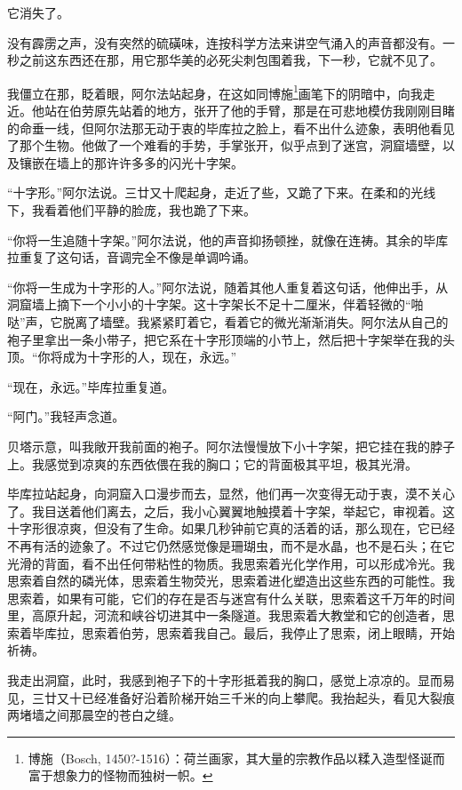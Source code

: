 \documentclass[AutoFakeBold=true]{book}
\begin{document}
它消失了。

没有霹雳之声，没有突然的硫磺味，连按科学方法来讲空气涌入的声音都没有。一秒之前这东西还在那，用它那华美的必死尖刺包围着我，下一秒，它就不见了。

我僵立在那，眨着眼，阿尔法站起身，在这如同博施\footnote{博施（Bosch, 1450?-1516）：荷兰画家，其大量的宗教作品以糅入造型怪诞而富于想象力的怪物而独树一帜。}画笔下的阴暗中，向我走近。他站在伯劳原先站着的地方，张开了他的手臂，那是在可悲地模仿我刚刚目睹的命垂一线，但阿尔法那无动于衷的毕库拉之脸上，看不出什么迹象，表明他看见了那个生物。他做了一个难看的手势，手掌张开，似乎点到了迷宫，洞窟墙壁，以及镶嵌在墙上的那许许多多的闪光十字架。

``十字形。''阿尔法说。三廿又十爬起身，走近了些，又跪了下来。在柔和的光线下，我看着他们平静的脸庞，我也跪了下来。

``你将一生追随十字架。''阿尔法说，他的声音抑扬顿挫，就像在连祷。其余的毕库拉重复了这句话，音调完全不像是单调吟诵。

``你将一生成为十字形的人。''阿尔法说，随着其他人重复着这句话，他伸出手，从洞窟墙上摘下一个小小的十字架。这十字架长不足十二厘米，伴着轻微的``啪哒''声，它脱离了墙壁。我紧紧盯着它，看着它的微光渐渐消失。阿尔法从自己的袍子里拿出一条小带子，把它系在十字形顶端的小节上，然后把十字架举在我的头顶。``你将成为十字形的人，现在，永远。''

``现在，永远。''毕库拉重复道。

``阿门。''我轻声念道。

贝塔示意，叫我敞开我前面的袍子。阿尔法慢慢放下小十字架，把它挂在我的脖子上。我感觉到凉爽的东西依偎在我的胸口；它的背面极其平坦，极其光滑。

毕库拉站起身，向洞窟入口漫步而去，显然，他们再一次变得无动于衷，漠不关心了。我目送着他们离去，之后，我小心翼翼地触摸着十字架，举起它，审视着。这十字形很凉爽，但没有了生命。如果几秒钟前它真的活着的话，那么现在，它已经不再有活的迹象了。不过它仍然感觉像是珊瑚虫，而不是水晶，也不是石头；在它光滑的背面，看不出任何带粘性的物质。我思索着光化学作用，可以形成冷光。我思索着自然的磷光体，思索着生物荧光，思索着进化塑造出这些东西的可能性。我思索着，如果有可能，它们的存在是否与迷宫有什么关联，思索着这千万年的时间里，高原升起，河流和峡谷切进其中一条隧道。我思索着大教堂和它的创造者，思索着毕库拉，思索着伯劳，思索着我自己。最后，我停止了思索，闭上眼睛，开始祈祷。

我走出洞窟，此时，我感到袍子下的十字形抵着我的胸口，感觉上凉凉的。显而易见，三廿又十已经准备好沿着阶梯开始三千米的向上攀爬。我抬起头，看见大裂痕两堵墙之间那晨空的苍白之缝。
\end{document}
